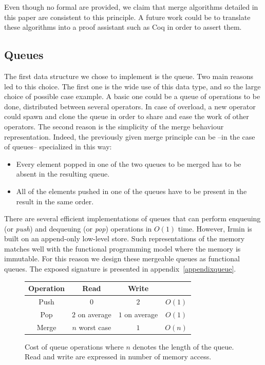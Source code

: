 \documentclass{article}
\newcommand{\coq}{Coq\xspace}
\newcommand{\irmin}{Irmin\xspace}
\begin{document}
\noindent Even though no formal are provided, we claim that merge algorithms detailed in this paper are consistent to this principle.
A future work could be to translate these algorithms into a proof assistant such as \coq in order to assert them.

\subsection{Queues}

The first data structure we chose to implement is the queue.
Two main reasons led to this choice.
The first one is the wide use of this data type, and so the large choice of possible case example.
A basic one could be a queue of operations to be done, distributed between several operators.
In case of overload, a new operator could spawn and clone the queue in order to share and ease the work of other operators.
The second reason is the simplicity of the merge behaviour representation.
Indeed, the previously given merge principle can be --in the case of queues-- specialized in this way:
\begin{itemize}
	\item Every element popped in one of the two queues to be merged has to be absent in the resulting queue.
	\item All of the elements pushed in one of the queues have to be present in the result in the same order.
\end{itemize}


There are several efficient implementations of queues that can perform enqueuing (or \emph{push}) and dequeuing (or \emph{pop}) operations in $O(1)$ time.
However, \irmin is built on an append-only low-level store.
Such representations of the memory matches well with the functional programming model where the memory is immutable.
For this reason we design these mergeable queues as functional queues.
The exposed signature is presented in appendix~\ref{appendixqueue}.

\begin{figure}[hbt]
\centering
\setlength{\tabcolsep}{0.5cm}
\begin{tabular}{|c|c|c|c|}
\hline
	Operation &
	Read &
	Write &
	\\
\hline
	Push &
	\cellcolor{chameleon!20} $0$ &
	\cellcolor{chameleon!20} $2$ &
	\cellcolor{chameleon!20} $O(1)$ \\
\hline
	Pop &
	\cellcolor{butter!20} $2$ on average &
	\cellcolor{butter!20} $1$ on average &
	\cellcolor{chameleon!20} $O(1)$ \\
\hline
\hline
	Merge &
	\cellcolor{scarletred!20} $n$ worst case &
	\cellcolor{chameleon!20} $1$ &
	\cellcolor{butter!20} $O(n)$ \\
\hline
\end{tabular}
\caption{Cost of queue operations where $n$ denotes the length of the queue. Read and write are expressed in number of memory access.}
\label{queuetable}
\end{figure}
\end{document}
